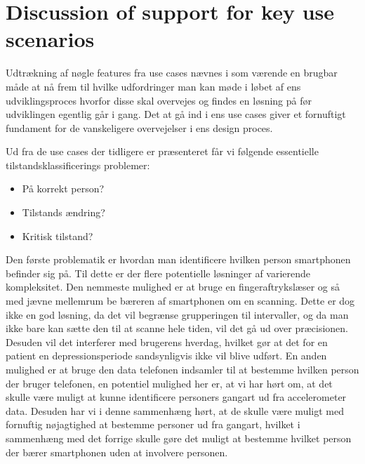 \section{Discussion of support for key use scenarios}
Udtrækning af nøgle features fra use cases nævnes i \citep[Afsnit 14.4, s94]{art:essence} som værende en brugbar måde at nå frem til hvilke udfordringer man kan møde i løbet af ens udviklingsproces hvorfor disse skal overvejes og findes en løsning på før udviklingen egentlig går i gang.
Det at gå ind i ens use cases giver et fornuftigt fundament for de vanskeligere overvejelser i ens design proces.

Ud fra de use cases der tidligere er præsenteret får vi følgende essentielle tilstandsklassificerings problemer:
\begin{itemize}
\item På korrekt person?
\item Tilstands ændring?
\item Kritisk tilstand?
\end{itemize}

Den første problematik er hvordan man identificere hvilken person smartphonen befinder sig på.
Til dette er der flere potentielle løsninger af varierende kompleksitet.
Den nemmeste mulighed er at bruge en fingeraftrykslæser og så med jævne mellemrum be bæreren af smartphonen om en scanning.
Dette er dog ikke en god løsning, da det vil begrænse grupperingen til intervaller, og da man ikke bare kan sætte den til at scanne hele tiden, vil det gå ud over præcisionen.
Desuden vil det interferer med brugerens hverdag, hvilket gør at det for en patient en depressionsperiode sandsynligvis ikke vil blive udført.
En anden mulighed er at bruge den data telefonen indsamler til at bestemme hvilken person der bruger telefonen, en potentiel mulighed her er, at vi har hørt om, at det skulle være muligt at kunne identificere personers gangart ud fra accelerometer data.
Desuden har vi i denne sammenhæng hørt, at de skulle være muligt med fornuftig nøjagtighed at bestemme personer ud fra gangart, hvilket i sammenhæng med det forrige skulle gøre det muligt at bestemme hvilket person der bærer smartphonen uden at involvere personen.

